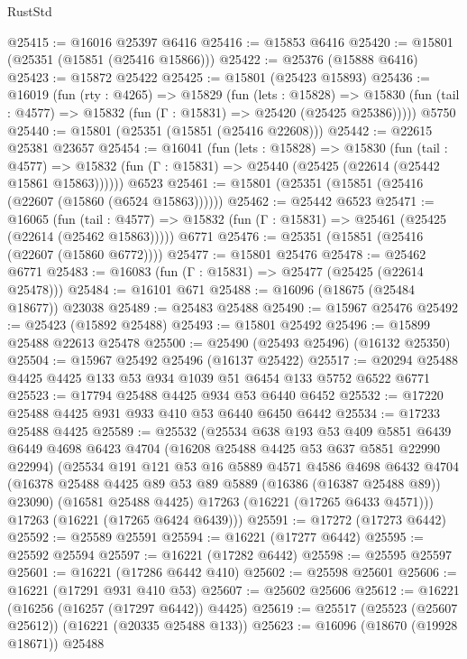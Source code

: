 \begin{lexlean}{RustStd}
\begin{coremodule}
@25415 := @16016 @25397 @6416
@25416 := @15853 @6416
@25420 := @15801 (@25351 (@15851 (@25416 @15866)))
@25422 := @25376 (@15888 @6416)
@25423 := @15872 @25422
@25425 := @15801 (@25423 @15893)
@25436 := @16019
    (fun (rty : @4265) =>
    @15829
      (fun (lets : @15828) =>
      @15830 (fun (tail : @4577) => @15832 (fun (Γ : @15831) => @25420 (@25425 @25386)))))
    @5750
@25440 := @15801 (@25351 (@15851 (@25416 @22608)))
@25442 := @22615 @25381 @23657
@25454 := @16041
    (fun (lets : @15828) =>
    @15830
      (fun (tail : @4577) =>
      @15832 (fun (Γ : @15831) => @25440 (@25425 (@22614 (@25442 @15861 @15863))))))
    @6523
@25461 := @15801 (@25351 (@15851 (@25416 (@22607 (@15860 (@6524 @15863))))))
@25462 := @25442 @6523
@25471 := @16065
    (fun (tail : @4577) => @15832 (fun (Γ : @15831) => @25461 (@25425 (@22614 (@25462 @15863)))))
    @6771
@25476 := @25351 (@15851 (@25416 (@22607 (@15860 @6772))))
@25477 := @15801 @25476
@25478 := @25462 @6771
@25483 := @16083 (fun (Γ : @15831) => @25477 (@25425 (@22614 @25478)))
@25484 := @16101 @671
@25488 := @16096 (@18675 (@25484 @18677)) @23038
@25489 := @25483 @25488
@25490 := @15967 @25476
@25492 := @25423 (@15892 @25488)
@25493 := @15801 @25492
@25496 := @15899 @25488 @22613 @25478
@25500 := @25490 (@25493 @25496) (@16132 @25350)
@25504 := @15967 @25492 @25496 (@16137 @25422)
@25517 := @20294 @25488 @4425 @4425 @133 @53 @934 @1039 @51 @6454 @133 @5752 @6522 @6771
@25523 := @17794 @25488 @4425 @934 @53 @6440 @6452
@25532 := @17220 @25488 @4425 @931 @933 @410 @53 @6440 @6450 @6442
@25534 := @17233 @25488 @4425
@25589 := @25532
    (@25534
      @638
      @193
      @53
      @409
      @5851
      @6439
      @6449
      @4698
      @6423
      @4704
      (@16208 @25488 @4425 @53 @637 @5851 @22990 @22994)
      (@25534
        @191
        @121
        @53
        @16
        @5889
        @4571
        @4586
        @4698
        @6432
        @4704
        (@16378 @25488 @4425 @89 @53 @89 @5889 (@16386 (@16387 @25488 @89)) @23090)
        (@16581 @25488 @4425)
        @17263
        (@16221 (@17265 @6433 @4571)))
      @17263
      (@16221 (@17265 @6424 @6439)))
@25591 := @17272 (@17273 @6442)
@25592 := @25589 @25591
@25594 := @16221 (@17277 @6442)
@25595 := @25592 @25594
@25597 := @16221 (@17282 @6442)
@25598 := @25595 @25597
@25601 := @16221 (@17286 @6442 @410)
@25602 := @25598 @25601
@25606 := @16221 (@17291 @931 @410 @53)
@25607 := @25602 @25606
@25612 := @16221 (@16256 (@16257 (@17297 @6442)) @4425)
@25619 := @25517 (@25523 (@25607 @25612)) (@16221 (@20335 @25488 @133))
@25623 := @16096 (@18670 (@19928 @18671)) @25488

\end{coremodule}
\end{lexlean}
